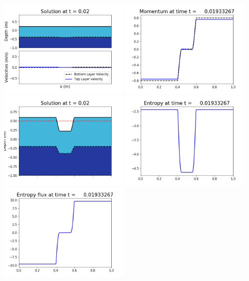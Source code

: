 \documentclass[11pt]{article}
\begin{document}
\includegraphics[width=0.475\textwidth]{frame0054fig1002.png}
\vskip 10pt 
\includegraphics[width=0.475\textwidth]{frame0054fig1003.png}
\includegraphics[width=0.475\textwidth]{frame0054fig1006.png}
\vskip 10pt 
\includegraphics[width=0.475\textwidth]{frame0054fig1007.png}
\includegraphics[width=0.475\textwidth]{frame0054fig1008.png}
\end{document}
